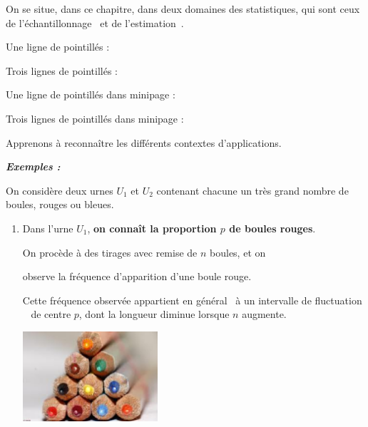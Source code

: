 \documentclass[12pt,french]{book}
\begin{document}
\begin{spacing}{1.2}
\begin{center}
\end{center}
On se situe, dans ce chapitre, dans deux domaines des statistiques, qui sont ceux de \og l'échantillonnage\fg~ et de \og l'estimation\fg~.

Une ligne de pointillés :

\Pointilles

Trois lignes de pointillés :

\Pointilles[3]

\begin{minipage}{0.45\linewidth}

Une ligne de pointillés dans minipage :
\Pointilles

\end{minipage}
\hfill
\begin{minipage}{0.45\linewidth}

Trois lignes de pointillés dans minipage :
\Pointilles[3]

\end{minipage}

Apprenons à reconnaître les différents contextes d'applications.

\medskip


\textbf{\textit{Exemples :}}

On considère deux urnes $U_1$ et $U_2$ contenant chacune un très grand nombre de boules, rouges ou bleues.

\begin{enumerate}
\item 
Dans l'urne $U_1$, \textbf{on connaît la proportion $p$ de boules rouges}.

\begin{minipage}{0.45\linewidth}
On procède à des tirages avec remise de $n$ boules, et on 

observe la fréquence d'apparition d'une boule rouge.

Cette fréquence observée appartient \og en général\fg~ à un \og intervalle de fluctuation \fg~ de centre $p$, dont la longueur diminue lorsque $n$ augmente.

\end{minipage}
\hfill
\begin{minipage}{0.45\linewidth}
\includegraphics[width=5cm]{fig.eps}


\end{minipage}
\end{enumerate}
\end{spacing}
\end{document}
